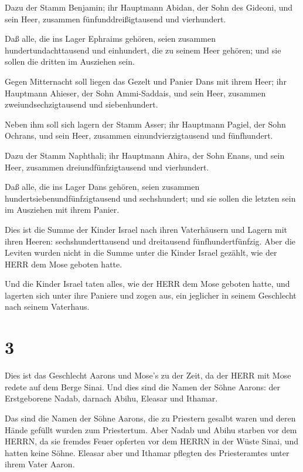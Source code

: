  Dazu der Stamm Benjamin; ihr Hauptmann Abidan, der Sohn
des Gideoni,  und sein Heer, zusammen fünfunddreißigtausend
und vierhundert.

 Daß alle, die ins Lager Ephraims gehören, seien zusammen
hundertundachttausend und einhundert, die zu seinem Heer gehören; und
sie sollen die dritten im Ausziehen sein.

 Gegen Mitternacht soll liegen das Gezelt und Panier Dans
mit ihrem Heer; ihr Hauptmann Ahieser, der Sohn Ammi-Saddais,
 und sein Heer, zusammen zweiundsechzigtausend und
siebenhundert.

 Neben ihm soll sich lagern der Stamm Asser; ihr Hauptmann
Pagiel, der Sohn Ochrans,  und sein Heer, zusammen
einundvierzigtausend und fünfhundert.

 Dazu der Stamm Naphthali; ihr Hauptmann Ahira, der Sohn
Enans,  und sein Heer, zusammen dreiundfünfzigtausend und
vierhundert.

 Daß alle, die ins Lager Dans gehören, seien zusammen
hundertsiebenundfünfzigtausend und sechshundert; und sie sollen die
letzten sein im Ausziehen mit ihrem Panier.

 Dies ist die Summe der Kinder Israel nach ihren
Vaterhäusern und Lagern mit ihren Heeren: sechshunderttausend und
dreitausend fünfhundertfünfzig.  Aber die Leviten wurden
nicht in die Summe unter die Kinder Israel gezählt, wie der HERR dem
Mose geboten hatte.

 Und die Kinder Israel taten alles, wie der HERR dem Mose
geboten hatte, und lagerten sich unter ihre Paniere und zogen aus, ein
jeglicher in seinem Geschlecht nach seinem Vaterhaus.

\hypertarget{section-2}{%
\section{3}\label{section-2}}

 Dies ist das Geschlecht Aarons und Mose's zu der Zeit, da
der HERR mit Mose redete auf dem Berge Sinai.  Und dies sind
die Namen der Söhne Aarons: der Erstgeborene Nadab, darnach Abihu,
Eleasar und Ithamar.

 Das sind die Namen der Söhne Aarons, die zu Priestern
gesalbt waren und deren Hände gefüllt wurden zum Priestertum.
 Aber Nadab und Abihu starben vor dem HERRN, da sie fremdes
Feuer opferten vor dem HERRN in der Wüste Sinai, und hatten keine Söhne.
Eleasar aber und Ithamar pflegten des Priesteramtes unter ihrem Vater
Aaron.

